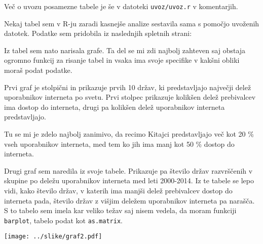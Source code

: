 \documentclass[11pt,a4paper]{article}
\begin{document}
Več o uvozu posamezne tabele je še v datoteki \verb|uvoz/uvoz.r| v komentarjih. 

\smallskip
Nekaj tabel sem v R-ju zaradi kasnejše analize sestavila sama s pomočjo uvoženih datotek.
\bigskip
Podatke sem pridobila iz naslednjih spletnih strani:

\bigskip
Iz tabel sem nato narisala grafe. Ta del se mi zdi najbolj zahteven saj obstaja ogromno funkcij za risanje tabel in vsaka ima svoje specifike v kakšni obliki moraš podat podatke.

\newpage
Prvi graf je stolpični in prikazuje prvih 10 držav, ki predstavljajo največji delež uporabnikov interneta po svetu. Prvi stolpec prikazuje kolikšen delež prebivalcev ima dostop do interneta, drugi pa kolikšen delež uporabnikov interneta predstavljajo.

Tu se mi je zdelo najbolj zanimivo, da recimo Kitajci predstavljajo več kot 20 \% vseh uporabnikov interneta, med tem ko jih ima manj kot 50 \% dostop do interneta.



\newpage
Drugi graf sem naredila iz svoje tabele. Prikazuje pa število držav razvrščenih v skupine po deležu uporabnikov interneta med leti 2000-2014. Iz te tabele se lepo vidi, kako število držav, v katerih ima manjši delež prebivalcev dostop do interneta pada, število držav z višjim deležem uporabnikov interneta pa narašča.
S to tabelo sem imela kar veliko težav saj nisem vedela, da moram funkciji \verb|barplot|, tabelo podat kot \verb|as.matrix|.

\texttt{[image: ../slike/graf2.pdf]}
\end{document}
